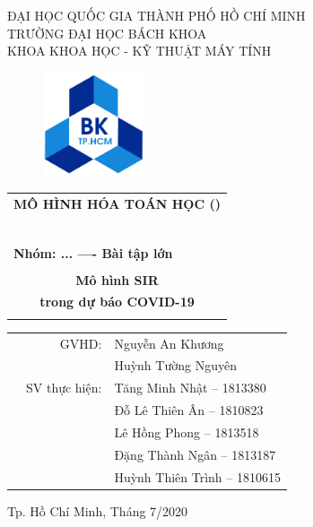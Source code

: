\documentclass[a4paper]{article}
\begin{document}
\begin{titlepage}
\begin{center}
ĐẠI HỌC QUỐC GIA THÀNH PHỐ HỒ CHÍ MINH \\
TRƯỜNG ĐẠI HỌC BÁCH KHOA \\
KHOA KHOA HỌC - KỸ THUẬT MÁY TÍNH 
\end{center}

\vspace{1cm}

\begin{figure}[h!]
\begin{center}
\includegraphics[width=3cm]{Images/hcmut.png}
\end{center}
\end{figure}

\vspace{1cm}


\begin{center}
\begin{tabular}{c}
\multicolumn{1}{l}{\textbf{{\Large MÔ HÌNH HÓA TOÁN HỌC ()}}}\\
~~\\
\hline
\\
\multicolumn{1}{l}{\textbf{{\Large Nhóm: ... ---- Bài tập lớn}}}\\
\\
\textbf{{\Huge Mô hình SIR}} \\
\textbf{{\Huge trong dự báo COVID-19}}\\
\\
\hline
\end{tabular}
\end{center}

\vspace{1.5cm}

\begin{table}[h]
\begin{tabular}{rrl}
\hspace{5 cm} & GVHD: & Nguyễn An Khương\\
\hspace{5 cm} &  & Huỳnh Tường Nguyên\\

& SV thực hiện: & Tăng Minh Nhật -- 1813380 \\
& & Đỗ Lê Thiên Ân -- 1810823 \\
& & Lê Hồng Phong -- 1813518 \\
& & Đặng Thành Ngân -- 1813187 \\
& & Huỳnh Thiên Trình -- 1810615 \\
\end{tabular}
\end{table}
\vspace{1.5cm}
\begin{center}
{\footnotesize Tp. Hồ Chí Minh, Tháng 7/2020}
\end{center}
\end{titlepage}
\end{document}
